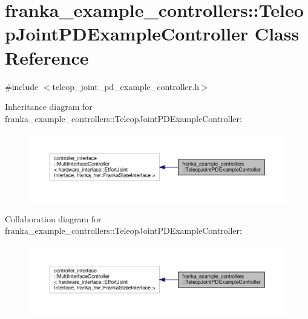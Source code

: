 \hypertarget{classfranka__example__controllers_1_1_teleop_joint_p_d_example_controller}{}\section{franka\+\_\+example\+\_\+controllers\+:\+:Teleop\+Joint\+P\+D\+Example\+Controller Class Reference}
\label{classfranka__example__controllers_1_1_teleop_joint_p_d_example_controller}


{\ttfamily \#include $<$teleop\+\_\+joint\+\_\+pd\+\_\+example\+\_\+controller.\+h$>$}



Inheritance diagram for franka\+\_\+example\+\_\+controllers\+:\+:Teleop\+Joint\+P\+D\+Example\+Controller\+:
\nopagebreak
\begin{figure}[H]
\begin{center}
\leavevmode
\includegraphics[width=350pt]{classfranka__example__controllers_1_1_teleop_joint_p_d_example_controller__inherit__graph}
\end{center}
\end{figure}


Collaboration diagram for franka\+\_\+example\+\_\+controllers\+:\+:Teleop\+Joint\+P\+D\+Example\+Controller\+:
\nopagebreak
\begin{figure}[H]
\begin{center}
\leavevmode
\includegraphics[width=350pt]{classfranka__example__controllers_1_1_teleop_joint_p_d_example_controller__coll__graph}
\end{center}
\end{figure}
